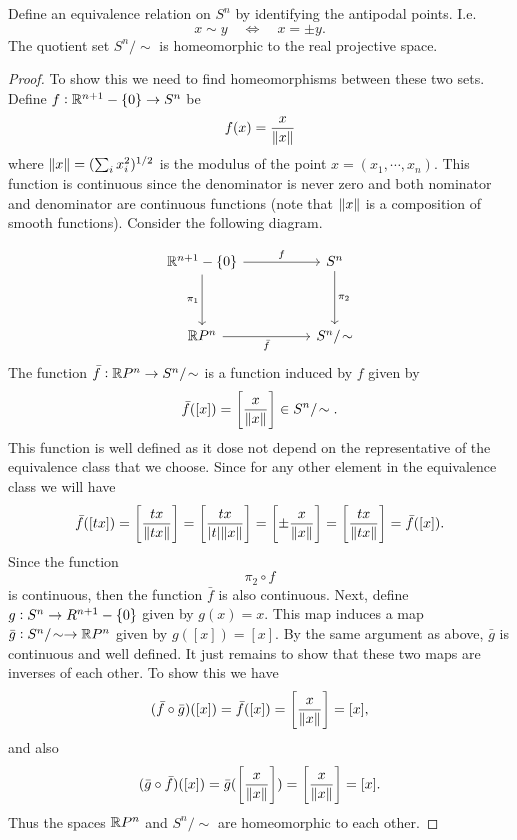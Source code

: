 \begin{proposition}
	Define an equivalence relation on $ S^n $ by identifying the antipodal points. I.e. 
	\[ x \sim y \quad \Longleftrightarrow \quad x = \pm y. \]
	The quotient set $ S^n/\sim $ is homeomorphic to the real projective space.
\end{proposition}
\begin{proof}
	To show this we need to find homeomorphisms between these two sets. Define $ f: \mathbb{R}^{n+1}-\{0\} \to S^n$ be
	\[ f(x) = \frac{x}{\norm{x}} \]
	where $ \norm{x} = (\sum_{i}x_i^2)^{1/2} $ is the modulus of the point $ x=(x_1,\cdots,x_n) $. This function is continuous since the denominator is never zero and both nominator and denominator are continuous functions (note that $ \norm{x} $ is a composition of smooth functions). Consider the following diagram. 

	\[\begin{tikzcd}
		{\R^{n+1}-\{0\}} && {S^n} \\
		\\
		{\R P ^n} && {S^n/\sim}
		\arrow["f", from=1-1, to=1-3]
		\arrow["{\pi_1}"', from=1-1, to=3-1]
		\arrow["{\pi_2}", from=1-3, to=3-3]
		\arrow["{\bar{f}}"', from=3-1, to=3-3]
	\end{tikzcd}\]
	The function $ \bar{f}: \R P^n \to S^n/\sim $ is a function induced by $ f $ given by
	\[ \bar{f}([x]) = \left[\frac{x}{\norm{x}}\right] \in S^n/\sim. \]
	This function is well defined as it dose not depend on the representative of the equivalence class that we choose. Since for any other element in the equivalence class we will have
	\[ \bar{f}([tx]) = \left[ \frac{tx}{\norm{tx}} \right]=\left[ \frac{tx}{|t|\norm{x}} \right] = \left[ \pm \frac{x}{\norm{x}} \right] = \left[ \frac{tx}{\norm{tx}} \right]  = \bar{f}([x]).  \]
	Since the function \[ \pi_2\circ f \] is continuous, then the function $ \bar{f} $ is also continuous. Next, define $ g: S^n \to R^{n+1} - \{0\} $ given by $ g(x) = x $. This map induces a map $ \bar{g}: S^n/\sim \to \R P^n $ given by $ g([x]) = [x] $. By the same argument as above, $ \bar{g} $ is continuous and well defined. It just remains to show that these two maps are inverses of each other. To show this we have
	\[ (\bar{f}\circ\bar{g})([x]) = \bar{f}([x]) = \left[ \frac{x}{\norm{x}} \right]  = [x], \]
	and also 
	\[ (\bar{g}\circ\bar{f})([x]) = \bar{g}(\left[ \frac{x}{\norm{x}} \right]) = \left[ \frac{x}{\norm{x}} \right] = [x]. \]
	Thus the spaces $ \mathbb{R} P^n $ and $ S^n/\sim $ are homeomorphic to each other.
\end{proof}

